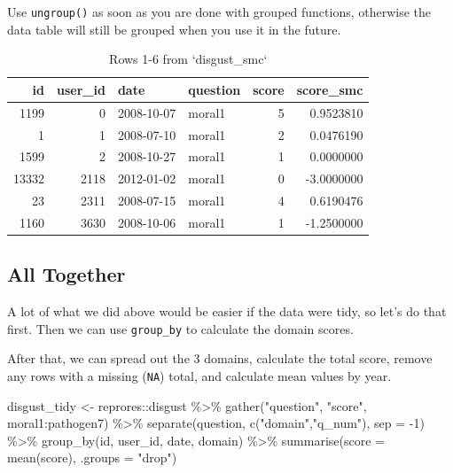 \documentclass[
  oneside]{book}
\newenvironment{Shaded}{\begin{snugshade}}{\end{snugshade}}
\newcommand{\AttributeTok}[1]{\textcolor[rgb]{0.77,0.63,0.00}{#1}}
\newcommand{\DecValTok}[1]{\textcolor[rgb]{0.00,0.00,0.81}{#1}}
\newcommand{\FunctionTok}[1]{\textcolor[rgb]{0.00,0.00,0.00}{#1}}
\newcommand{\NormalTok}[1]{#1}
\newcommand{\OtherTok}[1]{\textcolor[rgb]{0.56,0.35,0.01}{#1}}
\newcommand{\SpecialCharTok}[1]{\textcolor[rgb]{0.00,0.00,0.00}{#1}}
\newcommand{\StringTok}[1]{\textcolor[rgb]{0.31,0.60,0.02}{#1}}
\begin{document}
\begin{warning}
Use \texttt{ungroup()} as soon as you are done with grouped functions, otherwise the data table will still be grouped when you use it in the future.

\end{warning}

\begin{table}

\caption{\label{tab:group-by-mutate}Rows 1-6 from `disgust_smc`}
\centering
\begin{tabular}[t]{r|r|l|l|r|r}
\hline
id & user\_id & date & question & score & score\_smc\\
\hline
1199 & 0 & 2008-10-07 & moral1 & 5 & 0.9523810\\
\hline
1 & 1 & 2008-07-10 & moral1 & 2 & 0.0476190\\
\hline
1599 & 2 & 2008-10-27 & moral1 & 1 & 0.0000000\\
\hline
13332 & 2118 & 2012-01-02 & moral1 & 0 & -3.0000000\\
\hline
23 & 2311 & 2008-07-15 & moral1 & 4 & 0.6190476\\
\hline
1160 & 3630 & 2008-10-06 & moral1 & 1 & -1.2500000\\
\hline
\end{tabular}
\end{table}

\hypertarget{all-together}{%
\subsection{All Together}\label{all-together}}

A lot of what we did above would be easier if the data were tidy, so let's do that first. Then we can use \texttt{group\_by} to calculate the domain scores.

After that, we can spread out the 3 domains, calculate the total score, remove any rows with a missing (\texttt{NA}) total, and calculate mean values by year.

\begin{Shaded}
\begin{Highlighting}[]
\NormalTok{disgust\_tidy }\OtherTok{\textless{}{-}}\NormalTok{ reprores}\SpecialCharTok{::}\NormalTok{disgust }\SpecialCharTok{\%\textgreater{}\%}
  \FunctionTok{gather}\NormalTok{(}\StringTok{"question"}\NormalTok{, }\StringTok{"score"}\NormalTok{, moral1}\SpecialCharTok{:}\NormalTok{pathogen7) }\SpecialCharTok{\%\textgreater{}\%}
  \FunctionTok{separate}\NormalTok{(question, }\FunctionTok{c}\NormalTok{(}\StringTok{"domain"}\NormalTok{,}\StringTok{"q\_num"}\NormalTok{), }\AttributeTok{sep =} \SpecialCharTok{{-}}\DecValTok{1}\NormalTok{) }\SpecialCharTok{\%\textgreater{}\%}
  \FunctionTok{group\_by}\NormalTok{(id, user\_id, date, domain) }\SpecialCharTok{\%\textgreater{}\%}
  \FunctionTok{summarise}\NormalTok{(}\AttributeTok{score =} \FunctionTok{mean}\NormalTok{(score), }\AttributeTok{.groups =} \StringTok{"drop"}\NormalTok{)}
\end{Highlighting}
\end{Shaded}
\end{document}
